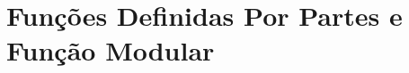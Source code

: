 \chapter{Funções Definidas Por Partes e Função Modular}
\label{cap:funcoes_definidas_por_partes_e_funcao_modular}

\minitoc







